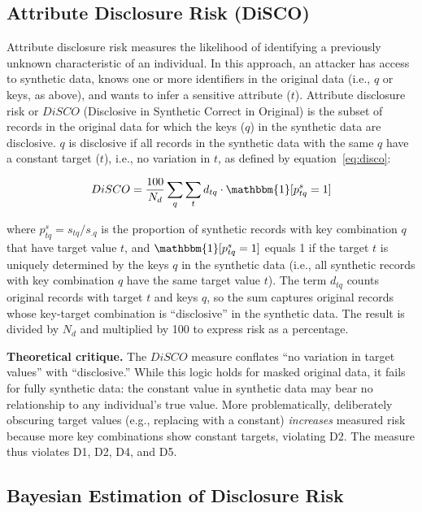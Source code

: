 \documentclass[Afour,sageh,times,doublespace]{sagej}
\begin{document}
\subsection{Attribute Disclosure Risk (DiSCO)}

Attribute disclosure risk measures the likelihood of identifying a previously unknown characteristic of an individual. In this approach, an attacker has access to synthetic data, knows one or more identifiers in the original data (i.e., $q$ or keys, as above), and wants to infer a sensitive attribute ($t$). Attribute disclosure risk or $DiSCO$ (Disclosive in Synthetic Correct in Original) is the subset of records in the original data for which the keys ($q$) in the synthetic data are disclosive. $q$ is disclosive if all records in the synthetic data with the same $q$ have a constant target ($t$), i.e., no variation in $t$, as defined by equation~\ref{eq:disco}:

\begin{equation}
DiSCO = \frac{100}{N_d} \sum_q \sum_t d_{tq} \cdot \mathbbm{1}[p^s_{tq} = 1]
\label{eq:disco}
\end{equation}

where $p^s_{tq} = s_{tq}/s_{.q}$ is the proportion of synthetic records with key combination $q$ that have target value $t$, and $\mathbbm{1}[p^s_{tq} = 1]$ equals 1 if the target $t$ is uniquely determined by the keys $q$ in the synthetic data (i.e., all synthetic records with key combination $q$ have the same target value $t$). The term $d_{tq}$ counts original records with target $t$ and keys $q$, so the sum captures original records whose key-target combination is ``disclosive'' in the synthetic data. The result is divided by $N_d$ and multiplied by 100 to express risk as a percentage.

\textbf{Theoretical critique.} The $DiSCO$ measure conflates ``no variation in target values'' with ``disclosive.'' While this logic holds for masked original data, it fails for fully synthetic data: the constant value in synthetic data may bear no relationship to any individual's true value. More problematically, deliberately obscuring target values (e.g., replacing with a constant) \textit{increases} measured risk because more key combinations show constant targets, violating D2. The measure thus violates D1, D2, D4, and D5.

\subsection{Bayesian Estimation of Disclosure Risk}
\end{document}
